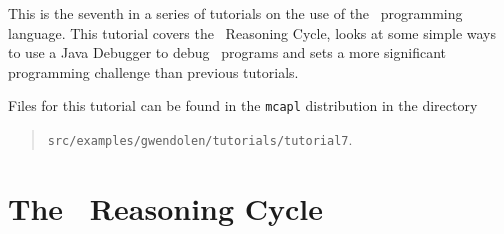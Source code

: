 This is the seventh in a series of tutorials on the use of the
\gwendolen\ programming language.  This tutorial covers the
\gwendolen\ Reasoning Cycle, looks at some simple ways to use a Java
Debugger to debug \gwendolen\ programs and sets a more significant
programming challenge than previous
tutorials. 

Files for this tutorial can be found in the \texttt{mcapl}
distribution in the directory 
\begin{quote}
\texttt{src/examples/gwendolen/tutorials/tutorial7}.
\end{quote}

\section{The \gwendolen\ Reasoning Cycle}

